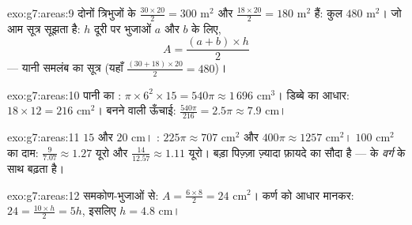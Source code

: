 \begin{solution}{exo:g7:areas:9}
दोनों त्रिभुजों के  $\frac{30 \times 20}{2} = 300$ m$^2$
और $\frac{18 \times 20}{2} = 180$ m$^2$ हैं: कुल $480$ m$^2$। जो आम
सूत्र सूझता है: $h$ दूरी पर  भुजाओं $a$ और $b$ के लिए,
\[
A = \frac{(a + b) \times h}{2}
\]
--- यानी समलंब का सूत्र (यहाँ $\frac{(30+18)\times 20}{2} = 480$)।
\end{solution}

\begin{solution}{exo:g7:areas:10}
पानी का : $\pi \times 6^2 \times 15 = 540\pi \approx 1\,696$
cm$^3$। डिब्बे का आधार: $18 \times 12 = 216$ cm$^2$। बनने वाली
ऊँचाई: $\frac{540\pi}{216} = 2.5\pi \approx 7.9$ cm।
\end{solution}

\begin{solution}{exo:g7:areas:11}
 $15$ और $20$ cm। : $225\pi \approx 707$ cm$^2$
और $400\pi \approx 1257$ cm$^2$। $100$ cm$^2$ का दाम:
$\frac{9}{7.07} \approx 1.27$ यूरो और
$\frac{14}{12.57} \approx 1.11$ यूरो। बड़ा पिज़्ज़ा ज़्यादा फ़ायदे
का सौदा है ---   के \emph{वर्ग} के साथ बढ़ता है।
\end{solution}

\begin{solution}{exo:g7:areas:12}
समकोण-भुजाओं से: $A = \frac{6 \times 8}{2} = 24$ cm$^2$। कर्ण को
आधार मानकर: $24 = \frac{10 \times h}{2} = 5h$, इसलिए
$h = 4.8$ cm।
\end{solution}


